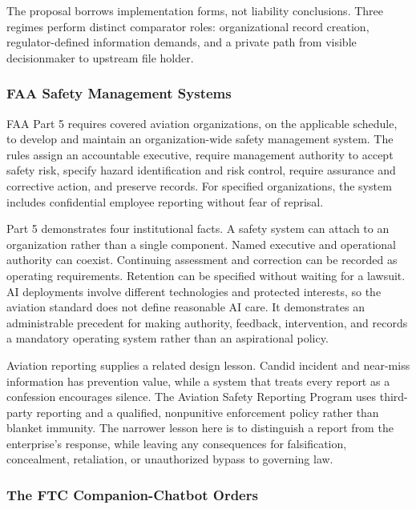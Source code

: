 The proposal borrows implementation forms, not liability conclusions. Three regimes perform distinct comparator roles: organizational record creation, regulator-defined information demands, and a private path from visible decisionmaker to upstream file holder.

\subsubsection{FAA Safety Management Systems}

FAA Part 5 requires covered aviation organizations, on the applicable schedule, to develop and maintain an organization-wide safety management system. The rules assign an accountable executive, require management authority to accept safety risk, specify hazard identification and risk control, require assurance and corrective action, and preserve records. For specified organizations, the system includes confidential employee reporting without fear of reprisal.

Part 5 demonstrates four institutional facts. A safety system can attach to an organization rather than a single component. Named executive and operational authority can coexist. Continuing assessment and correction can be recorded as operating requirements. Retention can be specified without waiting for a lawsuit. AI deployments involve different technologies and protected interests, so the aviation standard does not define reasonable AI care. It demonstrates an administrable precedent for making authority, feedback, intervention, and records a mandatory operating system rather than an aspirational policy.

Aviation reporting supplies a related design lesson. Candid incident and near-miss information has prevention value, while a system that treats every report as a confession encourages silence. The Aviation Safety Reporting Program uses third-party reporting and a qualified, nonpunitive enforcement policy rather than blanket immunity. The narrower lesson here is to distinguish a report from the enterprise's response, while leaving any consequences for falsification, concealment, retaliation, or unauthorized bypass to governing law.

\subsubsection{The FTC Companion-Chatbot Orders}

